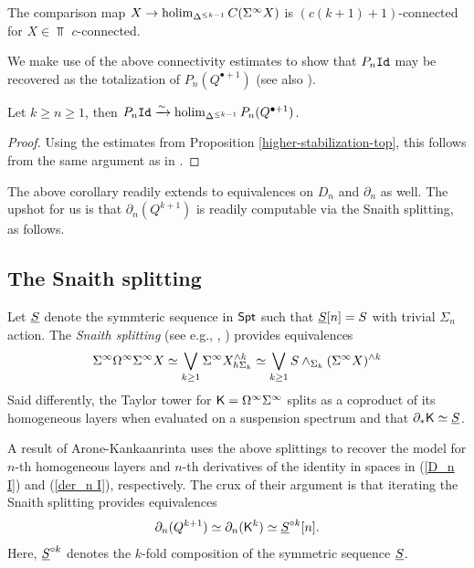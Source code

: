 \begin{proposition}
\label{higher-stabilization-top}
The comparison map $X\to \operatorname{holim}_{\Delta^{\leq k-1}} C(\Sigma^{\infty} X)$ is $(c(k+1)+1)$-connected for $X\in \Top$ $c$-connected.
\end{proposition}

We make use of the above connectivity estimates to show that $P_n \mathtt{Id}$ may be recovered as the totalization of $P_n (Q^{\bullet+1})$ (see also \cite[]{AC-1}).

\begin{corollary}
Let $k\geq n\geq 1$, then $P_n \mathtt{Id} \xrightarrow{\sim} \operatorname{holim}_{\Delta^{\leq k-1}} P_n (Q^{\bullet+1})$.
\end{corollary} 

\begin{proof}
    Using the estimates from Proposition \ref{higher-stabilization-top}, this follows from the same argument as in \cite[Proposition 4.7]{Clark-1}.
\end{proof}

The above corollary readily extends to equivalences on $D_n$ and $\partial_n$ as well. The upshot for us is that $\partial_n (Q^{k+1})$ is readily computable via the Snaith splitting, as follows. 

\subsection{The Snaith splitting} \label{sec:snaith-spl}
Let $\underline{S}$ denote the symmteric sequence in $\mathsf{Spt}$ such that $\underline{S}[n]=S$ with trivial $\Sigma_n$ action. The \textit{Snaith splitting} (see e.g., \cite{Snaith}, \cite{Coh-May-Tay}) provides equivalences
\begin{equation} 
\label{Snaith}
    \Sigma^{\infty} \Omega^{\infty} \Sigma^{\infty} X \simeq \bigvee_{k\geq 1} \Sigma^{\infty} X^{\wedge k}_{h\Sigma_k} \simeq \bigvee_{k\geq 1} S\wedge_{\Sigma_k} (\Sigma^{\infty} X)^{\wedge k}
\end{equation}
Said differently, the Taylor tower for $\mathsf{K}=\Omega^{\infty}\Sigma^{\infty}$ splits as a coproduct of its homogeneous layers when evaluated on a suspension spectrum and that $\partial_* \mathsf{K}\simeq \underline{S}$. 

A result of Arone-Kankaanrinta \cite{AK} uses the above splittings to recover the model for $n$-th homogeneous layers and $n$-th derivatives of the identity in spaces in (\ref{D_n I}) and (\ref{der_n I}), respectively. The crux of their argument is that iterating the Snaith splitting provides equivalences \[\partial_n (Q^{k+1})\simeq \partial_n (\mathsf{K}^{k})\simeq \underline{S} ^{\circ k}[n].\] 
Here, $\underline{S}^{\circ k}$ denotes the $k$-fold composition of the symmetric sequence $\underline{S}$.


